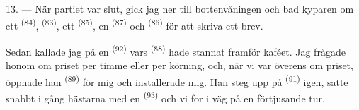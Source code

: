 13. --- När partiet var slut, gick jag ner till bottenvåningen och bad kyparen om ett
 \textsuperscript{(84)},  \textsuperscript{(83)}, ett
 \textsuperscript{(85)}, en
 \textsuperscript{(87)} och  \textsuperscript{(86)}
för att skriva ett brev.

Sedan kallade jag på en  \textsuperscript{(92)} vars
 \textsuperscript{(88)} hade stannat framför kaféet. Jag frågade
honom om priset per timme eller per körning, och, när vi var överens om priset, öppnade han
 \textsuperscript{(89)} för mig och installerade mig. Han steg upp på
 \textsuperscript{(91)} igen, satte snabbt i gång hästarna med en
 \textsuperscript{(93)} och vi for i väg på en förtjusande tur.
\VUsaut{6.0mm}
\VUfilet{22mm}
